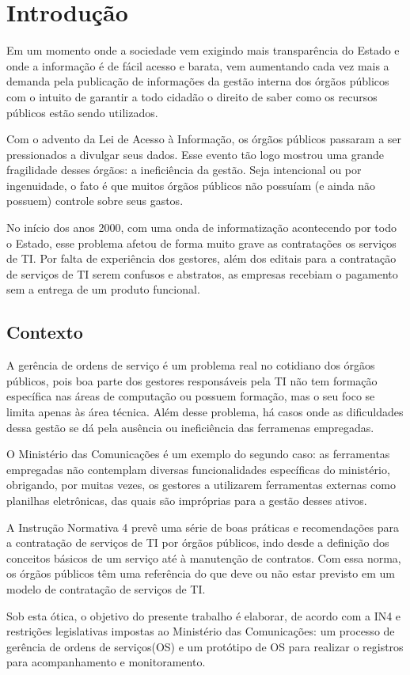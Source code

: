 \section{Introdução}

Em um momento onde a sociedade vem exigindo mais transparência do Estado e onde
a informação é de fácil acesso e barata, vem aumentando cada vez mais a demanda
pela publicação de informações da gestão interna dos órgãos públicos com o
intuito de garantir a todo cidadão o direito de saber como os recursos públicos
estão sendo utilizados.

Com o advento da Lei de Acesso à Informação, os órgãos públicos passaram a ser
pressionados a divulgar seus dados. Esse evento tão logo mostrou uma grande
fragilidade desses órgãos: a ineficiência da gestão. Seja intencional ou por
ingenuidade, o fato é que muitos órgãos públicos não possuíam (e ainda não
possuem) controle sobre seus gastos.

No início dos anos 2000, com uma onda de informatização acontecendo por todo o
Estado, esse problema afetou de forma muito grave as contratações os serviços
de TI. Por falta de experiência dos gestores, além dos editais para a
contratação de serviços de TI serem confusos e abstratos, as empresas recebiam
o pagamento sem a entrega de um produto funcional.

\subsection{Contexto}

A gerência de ordens de serviço é um problema real no cotidiano dos órgãos
públicos, pois boa parte dos gestores responsáveis pela TI não tem formação específica
nas áreas de computação ou possuem formação, mas o seu foco se limita
apenas às área técnica. Além desse problema, há casos onde as dificuldades
dessa gestão se dá pela ausência ou ineficiência das ferramenas empregadas.

O Ministério das Comunicações é um exemplo do segundo caso: as ferramentas
empregadas não contemplam diversas funcionalidades específicas do ministério,
obrigando, por muitas vezes, os gestores a utilizarem ferramentas externas como
planilhas eletrônicas, das quais são impróprias para a gestão desses ativos.

A Instrução Normativa 4 prevê uma série de boas práticas e recomendações para
a contratação de serviços de TI por órgãos públicos, indo desde a definição
dos conceitos básicos de um serviço até à manutenção de contratos. Com essa
norma, os órgãos públicos têm uma referência do que deve ou não estar previsto
em um modelo de contratação de serviços de TI.

Sob esta ótica, o objetivo do presente trabalho é elaborar, de acordo com a
IN4 e restrições legislativas impostas ao Ministério das Comunicações: um
processo de gerência de ordens de serviços(OS) e um protótipo de OS para
realizar o registros para acompanhamento e monitoramento.
